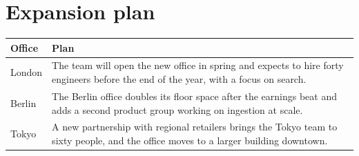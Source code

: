 \documentclass{article}
\begin{document}
\section*{Expansion plan}
\begin{tabular}{|p{3cm}|p{9cm}|}
\hline
Office & Plan \\ \hline
London & The team will open the new office in spring and expects to hire forty engineers before the end of the year, with a focus on search. \\ \hline
Berlin & The Berlin office doubles its floor space after the earnings beat and adds a second product group working on ingestion at scale. \\ \hline
Tokyo & A new partnership with regional retailers brings the Tokyo team to sixty people, and the office moves to a larger building downtown. \\ \hline
\end{tabular}
\end{document}
